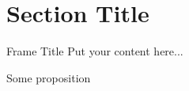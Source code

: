 \section{Section Title}

\begin{frame}{Frame Title}
	Put your content here...

\end{frame}

\begin{frame}{}
	\begin{proposition}
		Some proposition
	\end{proposition}

\end{frame}
